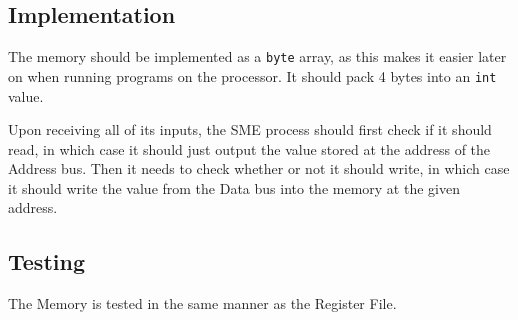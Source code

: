 \documentclass{beamer}
\begin{document}
\begin{frame}
    \begin{figure}
    \end{figure}
\end{frame}
\subsection{Implementation}
\begin{frame}
    The memory should be implemented as a \texttt{byte} array, as this makes it
    easier later on when running programs on the processor. It should pack 4
    bytes into an \texttt{int} value.

    \vspace{\baselineskip}
    Upon receiving all of its inputs, the SME process should first check if it
    should read, in which case it should just output the value stored at the
    address of the Address bus. Then it needs to check whether or not it should
    write, in which case it should write the value from the Data bus into the
    memory at the given address.
\end{frame}
\subsection{Testing}
\begin{frame}
    The Memory is tested in the same manner as the Register File.
\end{frame}
\end{document}
